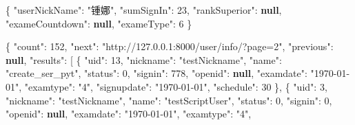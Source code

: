 \documentclass[
]{article}
\newenvironment{Shaded}{}{}
\newcommand{\DataTypeTok}[1]{\textcolor[rgb]{0.56,0.13,0.00}{#1}}
\newcommand{\DecValTok}[1]{\textcolor[rgb]{0.25,0.63,0.44}{#1}}
\newcommand{\FunctionTok}[1]{\textcolor[rgb]{0.02,0.16,0.49}{#1}}
\newcommand{\KeywordTok}[1]{\textcolor[rgb]{0.00,0.44,0.13}{\textbf{#1}}}
\newcommand{\OtherTok}[1]{\textcolor[rgb]{0.00,0.44,0.13}{#1}}
\newcommand{\StringTok}[1]{\textcolor[rgb]{0.25,0.44,0.63}{#1}}
\begin{document}
\begin{Shaded}
\begin{Highlighting}[]
\FunctionTok{\{}
  \DataTypeTok{"userNickName"}\FunctionTok{:} \StringTok{"锺娜"}\FunctionTok{,}
  \DataTypeTok{"sumSignIn"}\FunctionTok{:} \DecValTok{23}\FunctionTok{,}
  \DataTypeTok{"rankSuperior"}\FunctionTok{:} \KeywordTok{null}\FunctionTok{,}
  \DataTypeTok{"exameCountdown"}\FunctionTok{:} \KeywordTok{null}\FunctionTok{,}
  \DataTypeTok{"exameType"}\FunctionTok{:} \DecValTok{6}
\FunctionTok{\}}
\end{Highlighting}
\end{Shaded}

\begin{Shaded}
\begin{Highlighting}[]
\FunctionTok{\{}
  \DataTypeTok{"count"}\FunctionTok{:} \DecValTok{152}\FunctionTok{,}
  \DataTypeTok{"next"}\FunctionTok{:} \StringTok{"http://127.0.0.1:8000/user/info/?page=2"}\FunctionTok{,}
  \DataTypeTok{"previous"}\FunctionTok{:} \KeywordTok{null}\FunctionTok{,}
  \DataTypeTok{"results"}\FunctionTok{:} \OtherTok{[}
    \FunctionTok{\{}
      \DataTypeTok{"uid"}\FunctionTok{:} \DecValTok{13}\FunctionTok{,}
      \DataTypeTok{"nickname"}\FunctionTok{:} \StringTok{"testNickname"}\FunctionTok{,}
      \DataTypeTok{"name"}\FunctionTok{:} \StringTok{"create\_ser\_pyt"}\FunctionTok{,}
      \DataTypeTok{"status"}\FunctionTok{:} \DecValTok{0}\FunctionTok{,}
      \DataTypeTok{"signin"}\FunctionTok{:} \DecValTok{778}\FunctionTok{,}
      \DataTypeTok{"openid"}\FunctionTok{:} \KeywordTok{null}\FunctionTok{,}
      \DataTypeTok{"examdate"}\FunctionTok{:} \StringTok{"1970{-}01{-}01"}\FunctionTok{,}
      \DataTypeTok{"examtype"}\FunctionTok{:} \StringTok{"4"}\FunctionTok{,}
      \DataTypeTok{"signupdate"}\FunctionTok{:} \StringTok{"1970{-}01{-}01"}\FunctionTok{,}
      \DataTypeTok{"schedule"}\FunctionTok{:} \DecValTok{30}
    \FunctionTok{\}}\OtherTok{,}
    \FunctionTok{\{}
      \DataTypeTok{"uid"}\FunctionTok{:} \DecValTok{3}\FunctionTok{,}
      \DataTypeTok{"nickname"}\FunctionTok{:} \StringTok{"testNickname"}\FunctionTok{,}
      \DataTypeTok{"name"}\FunctionTok{:} \StringTok{"testScriptUser"}\FunctionTok{,}
      \DataTypeTok{"status"}\FunctionTok{:} \DecValTok{0}\FunctionTok{,}
      \DataTypeTok{"signin"}\FunctionTok{:} \DecValTok{0}\FunctionTok{,}
      \DataTypeTok{"openid"}\FunctionTok{:} \KeywordTok{null}\FunctionTok{,}
      \DataTypeTok{"examdate"}\FunctionTok{:} \StringTok{"1970{-}01{-}01"}\FunctionTok{,}
      \DataTypeTok{"examtype"}\FunctionTok{:} \StringTok{"4"}\FunctionTok{,}

\end{Highlighting}
\end{Shaded}
\end{document}
